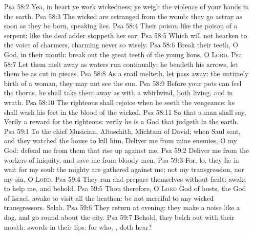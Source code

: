 \vs Psa 58:2 Yea, in heart ye work wickedness; ye weigh the violence of your hands in the earth.
\vs Psa 58:3 The wicked are estranged from the womb: they go astray as soon as they be born, speaking lies.
\vs Psa 58:4 Their poison  like the poison of a serpent:  like the deaf adder  stoppeth her ear;
\vs Psa 58:5 Which will not hearken to the voice of charmers, charming never so wisely.
\vs Psa 58:6 Break their teeth, O God, in their mouth: break out the great teeth of the young lions, O \textsc{Lord}.
\vs Psa 58:7 Let them melt away as waters  run continually:  he bendeth  his arrows, let them be as cut in pieces.
\vs Psa 58:8 As a snail  melteth, let  pass away:  the untimely birth of a woman,  they may not see the sun.
\vs Psa 58:9 Before your pots can feel the thorns, he shall take them away as with a whirlwind, both living, and in  wrath.
\vs Psa 58:10 The righteous shall rejoice when he seeth the vengeance: he shall wash his feet in the blood of the wicked.
\vs Psa 58:11 So that a man shall say, Verily  a reward for the righteous: verily he is a God that judgeth in the earth.
\vs Psa 59:1 To the chief Musician, Altaschith, Michtam of David; when Saul sent, and they watched the house to kill him. Deliver me from mine enemies, O my God: defend me from them that rise up against me.
\vs Psa 59:2 Deliver me from the workers of iniquity, and save me from bloody men.
\vs Psa 59:3 For, lo, they lie in wait for my soul: the mighty are gathered against me; not  my transgression, nor  my sin, O \textsc{Lord}.
\vs Psa 59:4 They run and prepare themselves without  fault: awake to help me, and behold.
\vs Psa 59:5 Thou therefore, O \textsc{Lord} God of hosts, the God of Israel, awake to visit all the heathen: be not merciful to any wicked transgressors. Selah.
\vs Psa 59:6 They return at evening: they make a noise like a dog, and go round about the city.
\vs Psa 59:7 Behold, they belch out with their mouth: swords  in their lips: for who, , doth hear?
